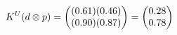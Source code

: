 \documentclass[preview]{standalone}
\begin{document}
\begin{align*}
\special{dvisvgm:raw <g id='unique000'>}K^U(d \otimes p) = \begin{pmatrix} (0.61)(0.46) \\ (0.90)(0.87) \end{pmatrix} = \begin{pmatrix} 0.28 \\ 0.78 \end{pmatrix}\special{dvisvgm:raw </g>}
\end{align*}
\end{document}
